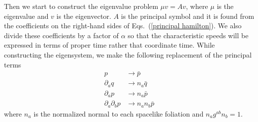\documentclass[letterpaper,nofootinbib,prd,amsmath,onecolumn]{revtex4-1}
\begin{document}
Then we start to construct the eigenvalue problem $\mu v = A v$, where $\mu$ is the eigenvalue and $v$ is the eigenvector. $A$ is the principal symbol and it is found from the coefficients on the right-hand sides of Eqs.~(\ref{principal hamilton}). We also divide these coefficients by a factor of $\alpha$ so that the characteristic speeds will be expressed in terms of proper time rather that coordinate time. While constructing the eigensystem, we make the following replacement of the principal terms
\begin{subequations}
\begin{align}
p & \rightarrow {\bar p}\\
\partial_{a}q &\rightarrow n_{a}{\bar q}\\
\partial_{a}p & \rightarrow n_{a}{\bar p}\\
\partial_{a}\partial_{b}p & \rightarrow n_{a}n_{b}{\bar p}
\end{align}
\end{subequations}
where $n_{a}$ is the normalized normal to each spacelike foliation and $n_{a}g^{ab}n_{b} = 1$.
\end{document}
